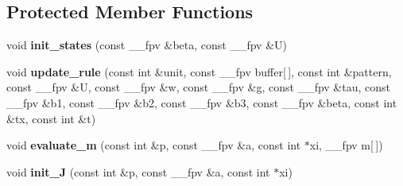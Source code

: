 \subsection*{Protected Member Functions}
\begin{DoxyCompactItemize}
\item 
\hypertarget{class_l_c___p_net_a2925dc1c225646f4be3e466383812f14}{}void {\bfseries init\+\_\+states} (const \+\_\+\+\_\+fpv \&beta, const \+\_\+\+\_\+fpv \&U)\label{class_l_c___p_net_a2925dc1c225646f4be3e466383812f14}

\item 
\hypertarget{class_l_c___p_net_aef7091aa9525fb95c3f1df19f801b535}{}void {\bfseries update\+\_\+rule} (const int \&unit, const \+\_\+\+\_\+fpv buffer\mbox{[}$\,$\mbox{]}, const int \&pattern, const \+\_\+\+\_\+fpv \&U, const \+\_\+\+\_\+fpv \&w, const \+\_\+\+\_\+fpv \&g, const \+\_\+\+\_\+fpv \&tau, const \+\_\+\+\_\+fpv \&b1, const \+\_\+\+\_\+fpv \&b2, const \+\_\+\+\_\+fpv \&b3, const \+\_\+\+\_\+fpv \&beta, const int \&tx, const int \&t)\label{class_l_c___p_net_aef7091aa9525fb95c3f1df19f801b535}

\item 
\hypertarget{class_l_c___p_net_a184fb2c6b021c7a814954e9750347b1c}{}void {\bfseries evaluate\+\_\+m} (const int \&p, const \+\_\+\+\_\+fpv \&a, const int $\ast$xi, \+\_\+\+\_\+fpv m\mbox{[}$\,$\mbox{]})\label{class_l_c___p_net_a184fb2c6b021c7a814954e9750347b1c}

\item 
\hypertarget{class_l_c___p_net_a22278003507e1871152e4024002a7ff9}{}void {\bfseries init\+\_\+\+J} (const int \&p, const \+\_\+\+\_\+fpv \&a, const int $\ast$xi)\label{class_l_c___p_net_a22278003507e1871152e4024002a7ff9}

\end{DoxyCompactItemize}
